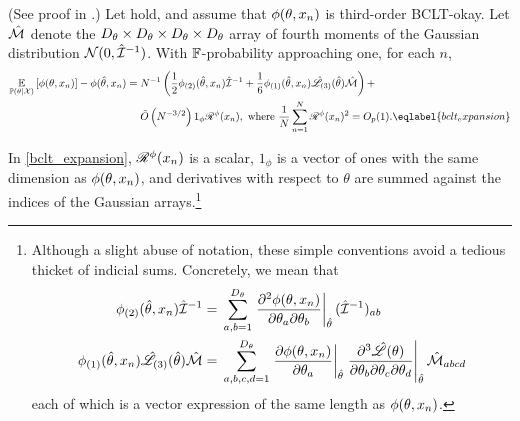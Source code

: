 %
\begin{thm}(See proof in .)
%
Let  hold, and assume that $\phi(\theta, x_n)$ is
third-order BCLT-okay.  Let $\hat{\mathcal{M}}$ denote the
$D_\theta\times D_\theta\times D_\theta\times D_\theta$ array of fourth moments
of the Gaussian distribution $\mathcal{N}(0, \hat{\mathcal{I}}^{-1})$. With
$\mathbb{F}$-probability approaching one, for each $n$,
%
\begin{align}
%
\expect{\post}{\phi(\theta, \x_n)} - \phi(\thetahat, \x_n)
={}&
N^{-1} \left(
    \frac{1}{2} \phigrad{2}(\thetahat, \x_n) \infohat^{-1} +
    \frac{1}{6} \phigrad{1}(\thetahat, \x_n) \likhatk{3}(\thetahat) \normfourth
\right) +
\nonumber\\&
\ordlog{N^{-3/2}} 1_{\phi} \resid{\phi}(\x_n),
\textrm{ where }\meann \resid{\phi}(\x_n)^2 = O_p(1).
\eqlabel{bclt_expansion}
%
\end{align}
%

In \eqref{bclt_expansion}, $\mathscr{R}^{\phi}(x_n)$ is a scalar,
$1_{\phi}$ is a vector of ones with the same dimension as $\phi(\theta, x_n)$, and
derivatives with
respect to $\theta$ are summed against the indices of the Gaussian
arrays.\footnote{Although a slight abuse of notation, these simple conventions
avoid a tedious thicket of indicial sums. Concretely, we mean that
%
\begin{align*}
\phigrad{2}(\thetahat, \x_n) \infohat^{-1} ={}&
    \sum_{a,b=1}^{\thetadim}
    \fracat{\partial^2 \phi(\theta, \x_n)}
           {\partial\theta_a \partial\theta_b}{\thetahat}
   (\infohat^{-1})_{ab}
\\
\phigrad{1}(\thetahat, \x_n) \likhatk{3}(\thetahat) \normfourth
={}&
\sum_{a,b,c,d=1}^{\thetadim}
\fracat{\partial \phi(\theta, \x_n)}{\partial\theta_a }{\thetahat}
\fracat{\partial^3 \likhat(\theta)}
       {\partial\theta_b \partial\theta_c \partial \theta_d }{\thetahat}
       \normfourth_{abcd}
%
\end{align*}
%
each of which is a vector expression of the same length as $\phi(\theta,
x_n)$.
}
%
\end{thm}
%

